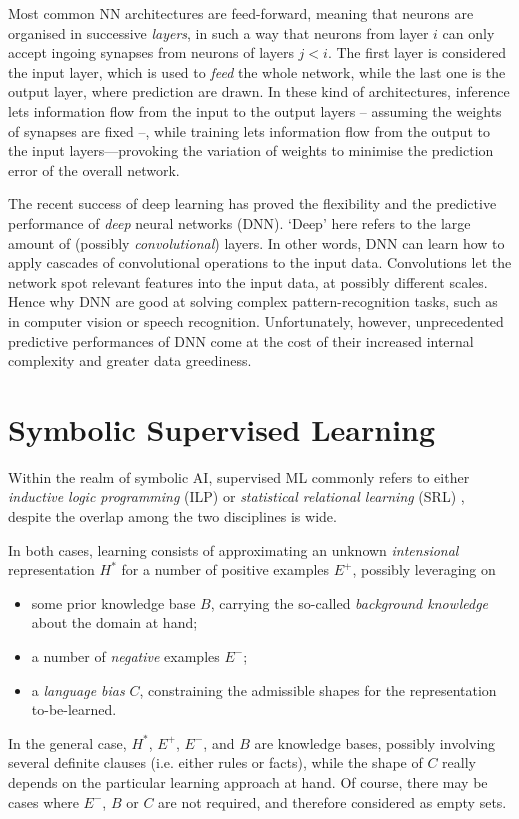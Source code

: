 \documentclass[12pt,a4paper,openright,twoside]{book}
\begin{document}
Most common NN architectures are feed-forward, meaning that neurons are organised in successive \emph{layers}, in such a way that neurons from layer $i$ can only accept ingoing synapses from neurons of layers $j < i$.
%
The first layer is considered the input layer, which is used to \emph{feed} the whole network, while the last one is the output layer, where prediction are drawn.
%
In these kind of architectures, inference lets information flow from the input to the output layers -- assuming the weights of synapses are fixed --, while training lets information flow from the output to the input layers---provoking the variation of weights to minimise the prediction error of the overall network.

The recent success of deep learning \cite{GoodfellowBC2016} has proved the flexibility and the predictive performance of \emph{deep} neural networks (DNN).
%
`Deep' here refers to the large amount of (possibly \emph{convolutional}) layers.
%
In other words, DNN can learn how to apply cascades of convolutional operations to the input data.
%
Convolutions let the network spot relevant features into the input data, at possibly different scales.
%
Hence why DNN are good at solving complex pattern-recognition tasks, such as in computer vision or speech recognition.
%
Unfortunately, however, unprecedented predictive performances of DNN come at the cost of their increased internal complexity and greater data greediness.

\section{Symbolic Supervised Learning}

Within the realm of symbolic AI, supervised ML commonly refers to either \emph{inductive logic programming} (ILP) \cite{Muggleton91} or \emph{statistical relational learning} (SRL) \cite{DeRaedt2010}, despite the overlap among the two disciplines is wide.

In both cases, learning consists of approximating an unknown \emph{intensional} representation $H^*$ for a number of positive examples $E^+$, possibly leveraging on
%
\begin{itemize}
    \item some prior knowledge base $B$, carrying the so-called \emph{background knowledge} about the domain at hand;
    \item a number of \emph{negative} examples $E^-$;
    \item a \emph{language bias} $C$, constraining the admissible shapes for the representation to-be-learned.
\end{itemize}
%
In the general case, $H^*$, $E^+$, $E^-$, and $B$ are knowledge bases, possibly involving several definite clauses (i.e. either rules or facts), while the shape of $C$ really depends on the particular learning approach at hand.
%
Of course, there may be cases where $E^-$, $B$ or $C$ are not required, and therefore considered as empty sets.
\end{document}

